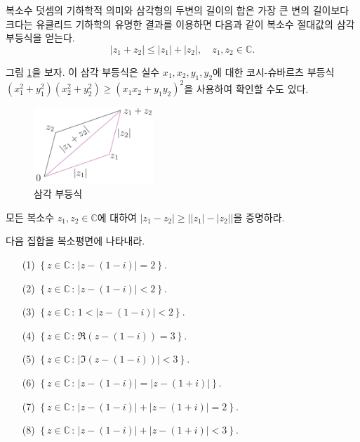 복소수 덧셈의 기하학적 의미와 
삼각형의 두변의 길이의 합은 가장 큰 변의 길이보다 크다는 
유클리드 기하학의 유명한 결과를 이용하면
다음과 같이 복소수 절대값의 삼각 부등식을 얻는다.
$$
|z_1+z_2| \le |z_1|  + |z_2|, \quad z_1, z_2\in\mathbb C.
$$

그림 \ref{fig-1-11}을 보자.
이 삼각 부등식은 실수 $x_1, x_2, y_1, y_2$에 대한 코시-슈바르츠 부등식
$(x_1^2+y_1^2) (x_2^2+y_2^2) \ge (x_1x_2 + y_1y_2)^2$을 사용하여
확인할 수도 있다.


\begin{figure}[!h]
\begin{center}
\includegraphics[width=0.4\textwidth]{./SaltChapter/figs/fig-1-11}
\end{center}
\caption{삼각 부등식}
\label{fig-1-11}
\end{figure}

\begin{salt_exercise} \label{ex-1-22}
모든 복소수 $z_1, z_2\in \mathbb C$에 대하여
$|z_1-z_2| \ge \big| |z_1| - |z_2| \big|$을 증명하라.
\end{salt_exercise}

\begin{salt_exercise} \label{ex-1-23}
다음 집합을 복소평면에 나타내라.
\begin{itemize}
\item[(1)] $\left\{z\in\mathbb C\,:\, |z-(1-i)| = 2 \right\}$.
\item[(2)] $\left\{z\in\mathbb C\,:\, |z-(1-i)| < 2 \right\}$.
\item[(3)] $\left\{z\in\mathbb C\,:\, 1< |z-(1-i)| < 2 \right\}$.
\item[(4)] $\left\{z\in\mathbb C\,:\, \Re(z-(1-i)) = 3 \right\}$.
\item[(5)] $\left\{z\in\mathbb C\,:\, |\Im(z-(1-i))| < 3 \right\}$.
\item[(6)] $\left\{z\in\mathbb C\,:\, |z-(1-i)| = |z-(1+i)| \right\}$.
\item[(7)] $\left\{z\in\mathbb C\,:\, |z-(1-i)| + |z-(1+i)| = 2 \right\}$.
\item[(8)] $\left\{z\in\mathbb C\,:\, |z-(1-i)| + |z-(1+i)| < 3 \right\}$.
\end{itemize}
\end{salt_exercise}

